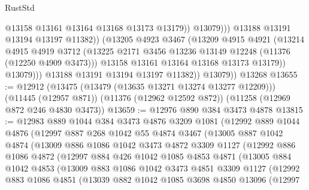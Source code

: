 \begin{lexlean}{RustStd}
\begin{coremodule}
{\begin{coremodule}
{{{{{{{{{{{{{{{{{{{{{{{{{{{{{{{{{{{{{{{{{{{{{{{{{{{{{{{{{{{{{{{{{{{{{{{{{{{{{{{{{{{{{                              @13158
                              @13161
                              @13164
                              @13168
                              @13173
                              @13179))
                          @13079)))
                    @13188
                    @13191
                    @13194
                    @13197
                    @11382))
                (@13205
                  @4923
                  @3467
                  (@13209
                    @4915
                    @4921
                    (@13214
                      @4915
                      @4919
                      @3712
                      (@13225 @2171 @3456 @13236 @13149 @12248 (@11376 (@12250 @4909 @3473)))
                      @13158
                      @13161
                      @13164
                      @13168
                      @13173
                      @13179))
                  @13079)))
            @13188
            @13191
            @13194
            @13197
            @11382))
        @13079))
    @13268
@13655 := @12912
    (@13475 (@13479 (@13635 @13271 @13274 @13277 @12209)))
    (@11445 (@12957 @871))
    (@11376 (@12962 @12592 @872))
    (@11258 (@12969 @872 @246 @4830 @3473))
@13659 := @12976 @890 @384 @3473 @4878
@13815 := @12983
    @889
    @1044
    @384
    @3473
    @4876
    @3209
    @1081
    (@12992
      @889
      @1044
      @4876
      (@12997
        @887
        @268
        @1042
        @55
        @4874
        @3467
        (@13005
          @887
          @1042
          @4874
          (@13009
            @886
            @1086
            @1042
            @3473
            @4872
            @3309
            @1127
            (@12992
              @886
              @1086
              @4872
              (@12997
                @884
                @426
                @1042
                @1085
                @4853
                @4871
                (@13005
                  @884
                  @1042
                  @4853
                  (@13009
                    @883
                    @1086
                    @1042
                    @3473
                    @4851
                    @3309
                    @1127
                    (@12992
                      @883
                      @1086
                      @4851
                      (@13039
                        @882
                        @1042
                        @1085
                        @3698
                        @4850
                        @13096
                        (@12997
}}}}}}}}}}}}}}}}}}}}}}}}}}}}}}}}}}}}}}}}}}}}}}}}}}}}}}}}}}}}}}}}}}}}}}}}}}}}}}}}}}}}}
\end{coremodule}}
\end{coremodule}
\end{lexlean}
